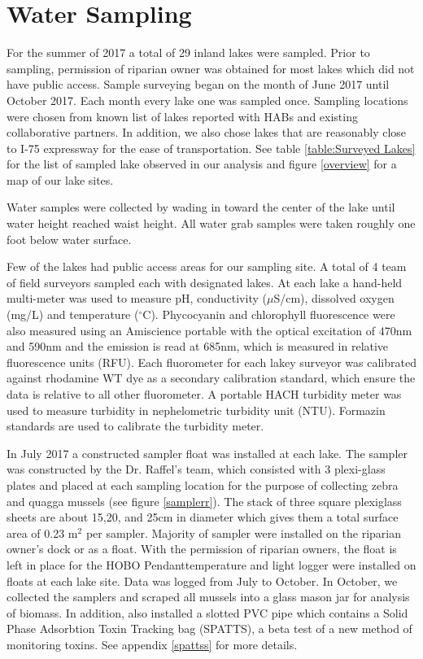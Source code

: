 

\section{Water Sampling} \label{sampling}

For the summer of 2017 a total of 29 inland lakes were sampled.  Prior to sampling, permission of riparian owner was obtained for most lakes which did not have public access. Sample surveying began on the month of June 2017 until October 2017. Each month every lake one was sampled once. Sampling locations were chosen from known list of lakes reported with HABs and existing collaborative partners. In addition, we also chose lakes that are reasonably close to I-75 expressway for the ease of transportation. See table \ref{table:Surveyed Lakes} for the list of sampled lake observed in our analysis and figure \ref{overview} for a map of our lake sites.

Water samples were collected by wading in toward the center of the lake until water height reached waist height. All water grab samples were taken roughly one foot below water surface.

Few of the lakes had public access areas for our sampling site. A total of 4 team of field surveyors sampled each with designated lakes. At each lake a hand-held multi-meter was used to measure pH, conductivity ($\mu$S/cm), dissolved oxygen (mg/L) and temperature ($^\circ$C). Phycocyanin and chlorophyll fluorescence were also measured using an Amiscience portable  with the optical excitation of 470nm and 590nm and the emission is read at 685nm, which is measured in relative fluorescence units (RFU). Each fluorometer for each lakey surveyor was calibrated against rhodamine WT dye as a secondary calibration standard, which ensure the data is relative to all other fluorometer. A portable HACH turbidity meter was used to measure turbidity in nephelometric turbidity unit (NTU). Formazin standards are used to calibrate the turbidity meter.



In July 2017 a constructed sampler float was installed at each lake. The sampler was constructed by the Dr. Raffel's team, which consisted with 3 plexi-glass plates and placed at each sampling location for the purpose of collecting zebra and quagga mussels (see figure \ref{samplerr}). The stack of three square plexiglass sheets are about 15,20, and 25cm in diameter which gives them a total surface area of 0.23 m$^2$ per sampler. Majority of sampler were installed on the riparian owner's dock or as a float. With the permission of riparian owners, the float is left in place for the  HOBO Pendant\texttrademark temperature and light logger were installed on floats at each lake site. Data was logged from July to October. In October, we collected the samplers and scraped all mussels into a glass mason jar for analysis of biomass. In addition, also installed a slotted PVC pipe which contains a Solid Phase Adsorbtion Toxin Tracking bag (SPATTS), a beta test of a new method of monitoring toxins. See appendix \ref{spattss} for more details.


